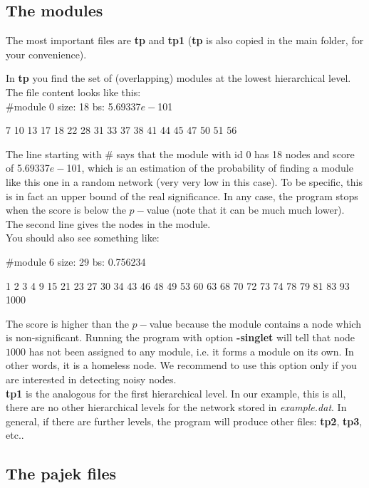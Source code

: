 \documentclass[11pt]{article}
\begin{document}
\subsection{The modules}
\label{sec2.1}

The most important files are \textbf{tp} and \textbf{tp1} (\textbf{tp} is also copied in the main folder, for your convenience).

In \textbf{tp} you find the set of (overlapping) modules at the lowest hierarchical level. The file content looks like this:
\\

\#module 0 size: 18 bs: 5.69337$e-$101

7 10 13 17 18 22 28 31 33 37 38 41 44 45 47 50 51 56


{\footnotesize The line starting with \# says that the module with id 0 has 18
nodes 
and score of 5.69337$e-$101, which is an estimation of 
the probability of finding a module 
like this one in a random network (very very low in this case). To be specific, this is in fact an upper bound of the real significance. In any case, 
the program stops when the score is below the $p-$value (note that it can be much much lower). 
The second line gives the nodes in the module.}
\\

You should also see something like:

\#module 6 size: 29 bs: 0.756234


1 2 3 4 9 15 21 23 27 30 34 43 46 48 49 53 60 63 68 70 72 73 74 78 79 81 83 93 1000 

{\footnotesize The score is higher than the $p-$value because the module contains a node which is non-significant. Running the program with option 
\textbf{-singlet} will tell that node $1000$ has not been
  assigned to any module, i.e. it forms a module on its own. In other words, it is a homeless node. We recommend to use this option only if you are interested in detecting noisy nodes.}
\\

\textbf{tp1} is the analogous for the first hierarchical level. In our example, this is all, there are no other hierarchical levels for the network stored
in {\it example.dat}. In general, if there are further levels, the
program will produce other files: {\bf tp2}, {\bf tp3}, etc..
\\

\subsection{The pajek files}
\end{document}
